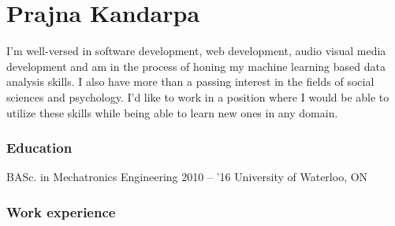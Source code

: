 \documentclass{tccv}
\begin{document}
\part{Prajna Kandarpa}
I'm well-versed in software development, web development, audio visual media development and am in the process of honing my machine learning based data analysis skills. I also have more than a passing interest in the fields of social sciences and psychology. I'd like to work in a position where I would be able to utilize these skills while being able to learn new ones in any domain. 
\section{Education}

\begin{yearlist}

\item[BASc. in Mechatronics Engineering]{2010 -- '16}
  {University of Waterloo, ON}
  {}
\end{yearlist}
\section{Work experience}
\end{document}
